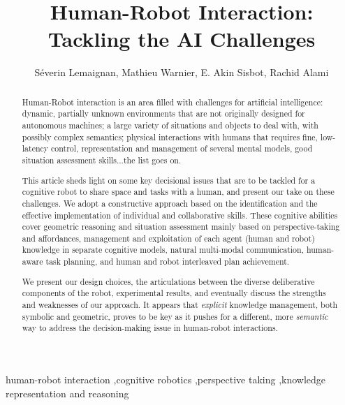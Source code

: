 \documentclass[preprint,3p,times]{elsarticle}
\begin{document}
\begin{frontmatter}

\title{\LARGE \bf
Human-Robot Interaction: Tackling the AI Challenges
}

\author{Séverin Lemaignan, Mathieu Warnier, E. Akin Sisbot, Rachid Alami}

\address{
CNRS, LAAS, 7 avenue du Colonel Roche, F-31400 Toulouse, France\\
Univ de Toulouse, LAAS, F-31400 Toulouse, France\\
{\tt firstname.lastname@laas.fr}
}




\begin{abstract}

Human-Robot interaction is an area filled with challenges for artificial
intelligence: dynamic, partially unknown environments that are not originally
designed for autonomous machines; a large variety of situations and objects to
deal with, with possibly complex semantics; physical interactions with humans
that requires fine, low-latency control, representation and management of
several mental models, good situation assessment skills...the list goes on.

This article sheds light on some key decisional issues that are to be tackled
for a cognitive robot to share space and tasks with a human, and present our
take on these challenges. We adopt a constructive approach based on the
identification and the effective implementation of individual and collaborative
skills. These cognitive abilities cover geometric reasoning and situation
assessment mainly based on perspective-taking and affordances, management and
exploitation of each agent (human and robot) knowledge in separate cognitive
models, natural multi-modal communication, human-aware task planning, and human
and robot interleaved plan achievement.

We present our design choices, the articulations between the diverse
deliberative components of the robot, experimental results, and eventually
discuss the strengths and weaknesses of our approach. It appears that
\emph{explicit} knowledge management, both symbolic and geometric, proves to be
key as it pushes for a different, more \emph{semantic} way to address the
decision-making issue in human-robot interactions.

\end{abstract}

\begin{keyword}
    human-robot interaction \sep cognitive robotics \sep perspective taking \sep knowledge representation and reasoning

\end{keyword}

\end{frontmatter}
\end{document}
